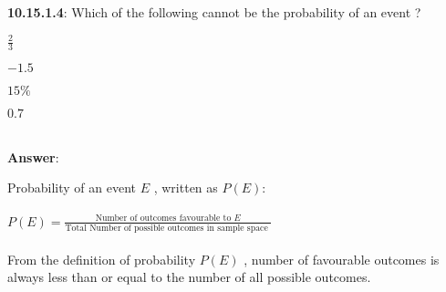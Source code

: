 \documentclass[journal,12pt,twocolumn]{IEEEtran}
\begin{document}
\noindent  \textbf{10.15.1.4}:
 Which of the following cannot be the probability of an event ?
\vspace{7pt}


\begin{enumerate*}
   
\item \hspace{4pt}\(\displaystyle\frac{2}{3}\) \hspace{5pt} \item \hspace{4pt}\(-1.5\) \hspace{5pt} \item \hspace{4pt}\(15\%\) \hspace{5pt}  \item \hspace{4pt} \(0.7\) \hspace{5pt}     
\end{enumerate*}\\

\noindent \textbf{Answer}:

Probability of an event \(E\) , written as \(P(E)\):\\
\\
\(P(E)=\displaystyle\frac{\text{Number of outcomes favourable to $E$}}{\text{Total Number of possible outcomes in sample space }}
\)
\\
\\
From the definition of probability \(P(E)\) , number of favourable outcomes is always less than or equal to the number of all possible outcomes.
\end{document}
